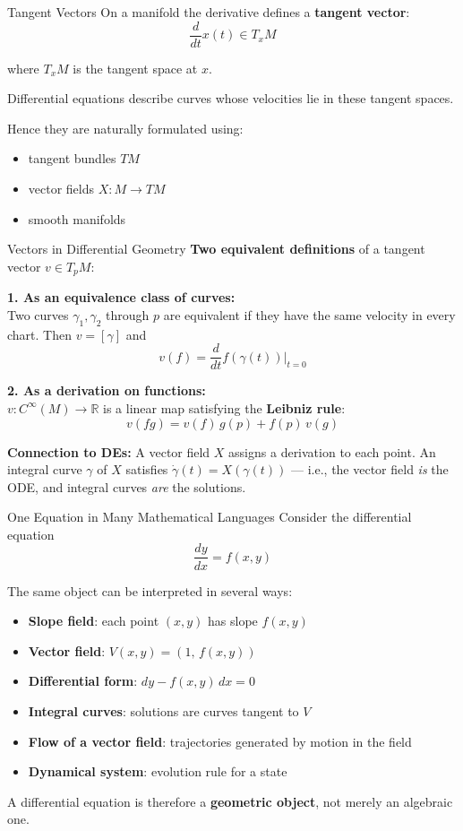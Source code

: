 \begin{frame}{Tangent Vectors}
On a manifold the derivative defines a \textbf{tangent vector}:
\[
\frac{d}{dt}x(t) \in T_xM
\]

where $T_xM$ is the tangent space at $x$.

Differential equations describe curves whose velocities lie in these tangent spaces.

Hence they are naturally formulated using:
\begin{itemize}
\item tangent bundles $TM$
\item vector fields $X : M \to TM$
\item smooth manifolds
\end{itemize}
\end{frame}


\begin{frame}{Vectors in Differential Geometry}
\textbf{Two equivalent definitions} of a tangent vector $v \in T_pM$:

\vspace{0.2cm}
\textbf{1. As an equivalence class of curves:} \\
Two curves $\gamma_1, \gamma_2$ through $p$ are equivalent if they have the same velocity in every chart. Then $v = [\gamma]$ and
\[
v(f) = \frac{d}{dt}f(\gamma(t))\Big|_{t=0}
\]

\textbf{2. As a derivation on functions:} \\
$v : C^\infty(M) \to \mathbb{R}$ is a linear map satisfying the \textbf{Leibniz rule}:
\[
v(fg) = v(f)\,g(p) + f(p)\,v(g)
\]

\vspace{0.2cm}
\textbf{Connection to DEs:} A vector field $X$ assigns a derivation to each point.
An integral curve $\gamma$ of $X$ satisfies $\dot{\gamma}(t) = X(\gamma(t))$ --- i.e., the vector field \emph{is} the ODE, and integral curves \emph{are} the solutions.
\end{frame}


\begin{frame}{One Equation in Many Mathematical Languages}
Consider the differential equation
\[
\frac{dy}{dx} = f(x,y)
\]

The same object can be interpreted in several ways:

\begin{itemize}
\item \textbf{Slope field}: each point $(x,y)$ has slope $f(x,y)$
\item \textbf{Vector field}: $V(x,y) = (1,\, f(x,y))$
\item \textbf{Differential form}: $dy - f(x,y)\,dx = 0$
\item \textbf{Integral curves}: solutions are curves tangent to $V$
\item \textbf{Flow of a vector field}: trajectories generated by motion in the field
\item \textbf{Dynamical system}: evolution rule for a state
\end{itemize}

A differential equation is therefore a \textbf{geometric object}, not merely an algebraic one.
\end{frame}


